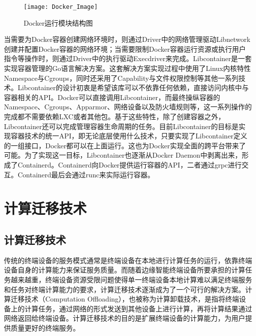 \begin{figure}[!htbp]
    \centering
    \texttt{[image: Docker\_Image]}
    \caption{Docker运行模块结构图}
    \label{fig:docker_image}
\end{figure}

当需要为Docker容器创建网络环境时，则通过Driver中的网络管理驱动Libnetwork创建并配置Docker容器的网络环境；当需要限制Docker容器运行资源或执行用户指令等操作时，则通过Driver中的执行驱动Execdriver来完成。Libcontainer是一套实现容器管理的Go语言解决方案。这套解决方案实现过程中使用了Linux内核特性Namespace与Cgroups，同时还采用了Capability与文件权限控制等其他一系列技术。Libcontainer的设计初衷是希望该库可以不依靠任何依赖，直接访问内核中与容器相关的API。Docker可以直接调用Libcontainer，而最终操纵容器的Namespace、Cgroups、Apparmor、网络设备以及防火墙规则等，这一系列操作的完成都不需要依赖LXC或者其他包。基于这些特性，除了创建容器之外，Libcontainer还可以完成管理容器生命周期的任务。目前Libcontainer的目标是实现容器技术的统一API，即无论底层使用什么技术，只要实现了Libcontainer定义的一组接口，Docker都可以在上面运行。这也为Docker实现全面的跨平台带来了可能。为了实现这一目标，Libcontainer也逐渐从Docker Daemon中剥离出来，形成了Containerd。Containerd向Docker提供运行容器的API，二者通过grpc进行交互。Containerd最后会通过runc来实际运行容器。



\section{计算迁移技术}\label{sec:related_work_computing_offloading}
\subsection{计算迁移技术}

传统的终端设备的服务模式通常是终端设备在本地进行计算任务的运行，依靠终端设备自身的计算能力来保证服务质量。而随着边缘智能终端设备所要承担的计算任务越来越重，终端设备资源受限问题使得单一终端设备本地计算难以满足终端服务和任务对终端计算能力的要求，计算迁移技术逐渐成为了一个可行的解决方案\cite{张文丽2016智能移动终端计算迁移研究}。计算迁移技术（Computation Offloading），也被称为计算卸载技术，是指将终端设备上的计算任务，通过网络的形式发送到其他设备上进行计算，再将计算结果通过网络返回给终端设备。计算迁移技术的目的是扩展终端设备的计算能力，为用户提供质量更好的终端服务。

